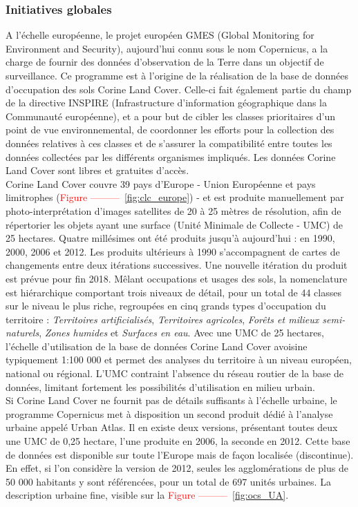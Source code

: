 \subsubsection{Initiatives globales}
\label{sssec:glob_ocs}
A l'échelle européenne, le projet européen GMES (Global Monitoring for Environment and Security), aujourd'hui connu sous le nom Copernicus, a la charge de fournir des données d'observation de la Terre dans un objectif de surveillance. Ce programme est à l'origine de la réalisation de la base de données d'occupation des sols Corine Land Cover. Celle-ci fait également partie du champ de la directive INSPIRE (Infrastructure d'information géographique dans la Communauté européenne), et a pour but de cibler les classes prioritaires d'un point de vue environnemental, de coordonner les efforts pour la collection des données relatives à ces classes et de s'assurer la compatibilité entre toutes les données collectées par les différents organismes impliqués. Les données Corine Land Cover sont libres et gratuites d'accès.\\
Corine Land Cover couvre 39 pays d'Europe - Union Européenne et pays limitrophes (\textcolor{red}{Figure ---------~\ref{fig:clc_europe}}) - et est produite manuellement par photo-interprétation d'images satellites de 20 à 25 mètres de résolution, afin de répertorier les objets ayant une surface (Unité Minimale de Collecte - UMC) de 25 hectares. Quatre millésimes ont été produits jusqu'à aujourd'hui : en 1990, 2000, 2006 et 2012. Les produits ultérieurs à 1990 s'accompagnent de cartes de changements entre deux itérations successives. Une nouvelle itération du produit est prévue pour fin 2018. Mêlant occupations et usages des sols, la nomenclature est hiérarchique comportant trois niveaux de détail, pour un total de 44 classes sur le niveau le plus riche, regroupées en cinq grands types d'occupation du territoire : \textit{Territoires artificialisés}, \textit{Territoires agricoles}, \textit{Forêts et milieux semi-naturels}, \textit{Zones humides} et \textit{Surfaces en eau}. Avec une UMC de 25 hectares, l'échelle d'utilisation de la base de données Corine Land Cover avoisine typiquement 1:100 000 et permet des analyses du territoire à un niveau européen, national ou régional. L'UMC contraint l'absence du réseau routier de la base de données, limitant fortement les possibilités d'utilisation en milieu urbain.\\
Si Corine Land Cover ne fournit pas de détails suffisants à l'échelle urbaine, le programme Copernicus met à disposition un second produit dédié à l'analyse urbaine appelé Urban Atlas. Il en existe deux versions, présentant toutes deux une UMC de 0,25 hectare, l'une produite en 2006, la seconde en 2012. Cette base de données est disponible sur toute l'Europe mais de façon localisée (discontinue). En effet, si l'on considère la version de 2012, seules les agglomérations de plus de 50 000 habitants y sont référencées, pour un total de 697 unités urbaines. La description urbaine fine, visible sur la \textcolor{red}{Figure ---------~\ref{fig:ocs_UA}}.

